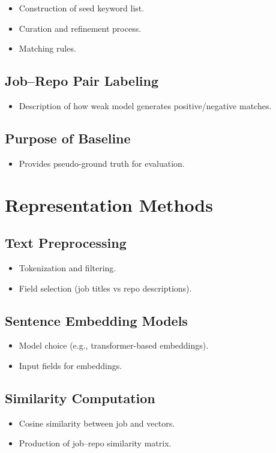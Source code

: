 \begin{itemize}
    \item Construction of seed keyword list.
    \item Curation and refinement process.
    \item Matching rules.
\end{itemize}

\subsection{Job–Repo Pair Labeling}
\begin{itemize}
    \item Description of how weak model generates positive/negative matches.
\end{itemize}

\subsection{Purpose of Baseline}
\begin{itemize}
    \item Provides pseudo-ground truth for evaluation.
\end{itemize}

\section{Representation Methods}
\subsection{Text Preprocessing}
\begin{itemize}
    \item Tokenization and filtering.
    \item Field selection (job titles vs repo descriptions).
\end{itemize}

\subsection{Sentence Embedding Models}
\begin{itemize}
    \item Model choice (e.g., transformer-based embeddings).
    \item Input fields for embeddings.
\end{itemize}

\subsection{Similarity Computation}
\begin{itemize}
    \item Cosine similarity between job and \repo{} vectors.
    \item Production of job–repo similarity matrix.
\end{itemize}

